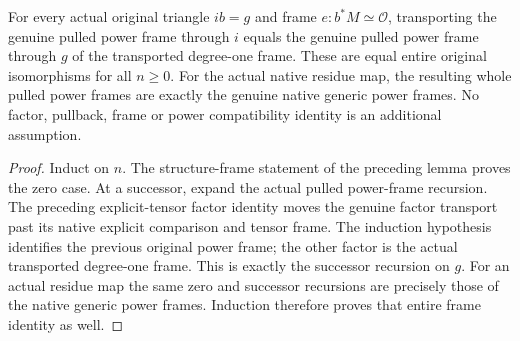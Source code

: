 \begin{theorem}\label{thm:fc-actual-pulled-power-frame-factor-coherence}
\leanok
{}
For every actual original triangle $ib=g$ and frame $e:b^*M\simeq
\mathcal O$, transporting the genuine pulled power frame through
$i$ equals the genuine pulled power frame through $g$ of the
transported degree-one frame. These are equal entire original
isomorphisms for all $n\geq0$. For the actual native residue map,
the resulting whole pulled power frames are exactly the genuine
native generic power frames. No factor, pullback, frame or power
compatibility identity is an additional assumption.
\end{theorem}
\begin{proof}
Induct on $n$. The structure-frame statement of the preceding
lemma proves the zero case. At a successor, expand the actual
pulled power-frame recursion. The preceding explicit-tensor
factor identity moves the genuine factor transport past its
native explicit comparison and tensor frame. The induction
hypothesis identifies the previous original power frame; the
other factor is the actual transported degree-one frame. This
is exactly the successor recursion on $g$. For an actual residue
map the same zero and successor recursions are precisely those
of the native generic power frames. Induction therefore proves
that entire frame identity as well.
\end{proof}
